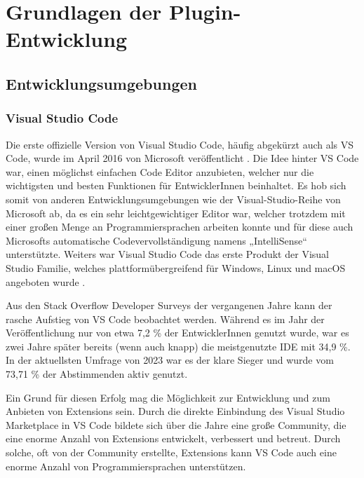 \chapter{Grundlagen der Plugin-Entwicklung}
\label{cha:Grundlagen}

\section{Entwicklungsumgebungen}
\label{sec:Entwicklungsumgebungen}

\subsection{Visual Studio Code}

Die erste offizielle Version von Visual Studio Code, häufig 
abgekürzt auch als VS Code, wurde im April 2016 
von Microsoft veröffentlicht \cite{VSCodeReleaseDate}. 
Die Idee hinter VS Code
war, einen möglichst einfachen Code Editor anzubieten, 
welcher nur die wichtigsten und besten Funktionen für EntwicklerInnen 
beinhaltet. Es hob sich somit von anderen Entwicklungsumgebungen
wie der Visual-Studio-Reihe von Microsoft ab, da es ein sehr 
leichtgewichtiger Editor war, welcher trotzdem mit einer großen 
Menge an Programmiersprachen arbeiten konnte und für diese auch 
Microsofts automatische Codevervollständigung namens „IntelliSense“ 
unterstützte. Weiters war Visual Studio Code das erste Produkt der Visual 
Studio Familie, welches plattformübergreifend für Windows, Linux und macOS 
angeboten wurde \cite{VSCodePreview}.

Aus den Stack Overflow Developer Surveys\cite{StackOverflowSurvey,StackOverflowSurvey2023}
der vergangenen Jahre kann 
der rasche Aufstieg von VS Code beobachtet werden. Während es im 
Jahr der Veröffentlichung nur von etwa 7,2 \% der EntwicklerInnen 
genutzt wurde, war es zwei Jahre später bereits (wenn auch knapp) 
die meistgenutzte IDE mit 34,9 \%. In der aktuellsten Umfrage von 
2023 war es der klare Sieger und wurde vom 73,71 \% der Abstimmenden 
aktiv genutzt\cite{StackOverflowSurvey,StackOverflowSurvey2023}.

Ein Grund für diesen Erfolg mag die Möglichkeit 
zur Entwicklung und zum Anbieten von Extensions sein. Durch die direkte 
Einbindung des Visual Studio Marketplace in VS Code bildete sich über die 
Jahre eine große Community, die eine enorme Anzahl von Extensions 
entwickelt, verbessert und betreut. Durch solche, oft 
von der Community erstellte, Extensions kann VS Code auch eine 
enorme Anzahl von Programmiersprachen unterstützen.


